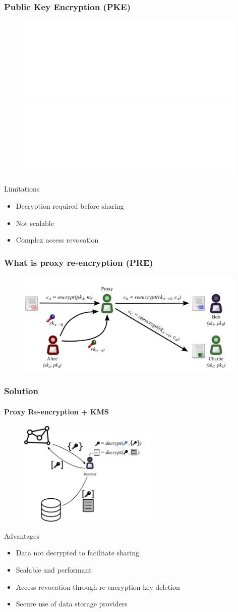 \documentclass[xetex,mathsans,sans,aspectratio=169]{beamer}
\begin{document}
    \begin{frame}
        \frametitle{Public Key Encryption (PKE)}
        \begin{figure}
            \centering
            \includegraphics<1>[width=11cm]{pdf/pke-multi.pdf}
            \includegraphics<2>[width=11cm]{pdf/pke-multi-hack.pdf}
        \end{figure}

        Limitations
        \begin{itemize}
            \item Decryption required before sharing
            \item Not scalable
            \item Complex access revocation
        \end{itemize}
    \end{frame}

    \begin{frame}
        \frametitle{What is proxy re-encryption (PRE)}
        \begin{figure}
            \centering
            \includegraphics[width=11cm]{pdf/pre-multi.pdf}
        \end{figure}
    \end{frame}

    \begin{frame}
        \frametitle{Solution}
        \framesubtitle{Proxy Re-encryption + KMS}
        \begin{figure}
            \centering
            \includegraphics[height=5cm]{pdf/pre-kms.pdf}
        \end{figure}

        Advantages
        \begin{itemize}
            \item Data not decrypted to facilitate sharing
            \item Scalable and performant
            \item Access revocation through re-encryption key deletion
            \item Secure use of data storage providers
        \end{itemize}
    \end{frame}
\end{document}
